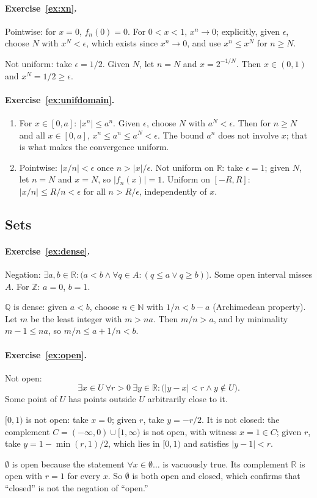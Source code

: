 \documentclass{workbook}
\theoremstyle{definition}
\newcommand{\N}{\mathbb{N}}
\newcommand{\Z}{\mathbb{Z}}
\newcommand{\Q}{\mathbb{Q}}
\newcommand{\R}{\mathbb{R}}
\newcommand{\ans}[1]{\paragraph{Exercise~\ref{#1}.}}
\begin{document}
\ans{ex:xn}
Pointwise: for $x = 0$, $f_n(0) = 0$. For $0 < x < 1$, $x^n \to 0$; explicitly, given $\epsilon$, choose $N$ with $x^N < \epsilon$, which exists since $x^n \to 0$, and use $x^n \le x^N$ for $n \ge N$.

Not uniform: take $\epsilon = 1/2$. Given $N$, let $n = N$ and $x = 2^{-1/N}$. Then $x \in (0,1)$ and $x^N = 1/2 \ge \epsilon$.

\ans{ex:unifdomain}
\begin{enumerate}
  \item For $x \in [0, a]$: $|x^n| \le a^n$. Given $\epsilon$, choose $N$ with $a^N < \epsilon$. Then for $n \ge N$ and all $x \in [0,a]$, $x^n \le a^n \le a^N < \epsilon$. The bound $a^n$ does not involve $x$; that is what makes the convergence uniform.
  \item Pointwise: $|x/n| < \epsilon$ once $n > |x|/\epsilon$. Not uniform on $\R$: take $\epsilon = 1$; given $N$, let $n = N$ and $x = N$, so $|f_n(x)| = 1$. Uniform on $[-R, R]$: $|x/n| \le R/n < \epsilon$ for all $n > R/\epsilon$, independently of $x$.
\end{enumerate}

\subsection*{Sets}

\ans{ex:dense}
Negation: $\exists a, b \in \R : \bigl(a < b \land \forall q \in A : (q \le a \lor q \ge b)\bigr)$. Some open interval misses $A$. For $\Z$: $a = 0$, $b = 1$.

$\Q$ is dense: given $a < b$, choose $n \in \N$ with $1/n < b - a$ (Archimedean property). Let $m$ be the least integer with $m > na$. Then $m/n > a$, and by minimality $m - 1 \le na$, so $m/n \le a + 1/n < b$.

\ans{ex:open}
Not open:
\[
  \exists x \in U\ \forall r > 0\ \exists y \in \R : \bigl(|y - x| < r \land y \notin U\bigr).
\]
Some point of $U$ has points outside $U$ arbitrarily close to it.

$[0,1)$ is not open: take $x = 0$; given $r$, take $y = -r/2$. It is not closed: the complement $C = (-\infty, 0) \cup [1, \infty)$ is not open, with witness $x = 1 \in C$; given $r$, take $y = 1 - \min(r, 1)/2$, which lies in $[0,1)$ and satisfies $|y - 1| < r$.

$\emptyset$ is open because the statement $\forall x \in \emptyset \dots$ is vacuously true. Its complement $\R$ is open with $r = 1$ for every $x$. So $\emptyset$ is both open and closed, which confirms that ``closed'' is not the negation of ``open.''
\end{document}
